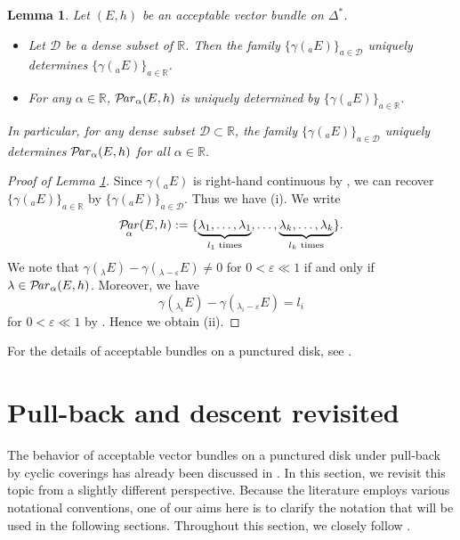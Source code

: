\documentclass[12pt,twoside]{amsart}
\DeclareMathOperator{\Par}{\mathcal{P}\!\it{ar}}
\newtheorem{lem}[thm]{Lemma}
\theoremstyle{definition}
\begin{document}
\begin{lem}\label{x-lem9.2}
Let $(E, h)$ be an acceptable vector bundle on $\Delta^*$. 
\begin{itemize}
\item[(i)] Let $\mathcal D$ be a dense subset of $\mathbb R$. 
Then the family $\{\gamma({}_a E)\}_{a\in \mathcal D}$ uniquely determines 
$\{\gamma({}_a E)\}_{a\in \mathbb R}$. 

\item[(ii)] For any $\alpha \in \mathbb R$, 
$\Par_\alpha (E, h)$ is uniquely determined by 
$\{\gamma({}_a E)\}_{a\in \mathbb R}$. 
\end{itemize}
In particular, for any dense subset $\mathcal D \subset \mathbb R$, 
the family $\{\gamma({}_a E)\}_{a\in \mathcal D}$ uniquely determines 
$\Par_\alpha (E, h)$ for all $\alpha \in \mathbb R$. 
\end{lem}

\begin{proof}[Proof of Lemma \ref{x-lem9.2}]
Since $\gamma ({}_a E)$ is right-hand continuous by 
\cite[Lemma 7.10]{fujino-fujisawa-ono}, we can recover 
$\{\gamma({}_a E)\}_{a\in \mathbb R}$ by 
$\{\gamma({}_a E)\}_{a\in \mathcal D}$. 
Thus we have (i). 
We write 
\[
\Par_\alpha(E, h) := \{\underbrace{\lambda_1, \ldots, \lambda_1}_{l_1\text{ times}}, \ldots,
\underbrace{\lambda_k, \ldots, \lambda_k}_{l_k\text{ times}}\}.
\] 
We note that $\gamma ({}_\lambda E)-\gamma({}_{\lambda-\varepsilon} E)\ne 0$ 
for $0<\varepsilon \ll 1$ if and only if 
$\lambda \in \Par_\alpha (E, h)$. 
Moreover, we have 
\[
\gamma ({}_{\lambda_i} E)-\gamma ({}_{\lambda_i-\varepsilon} E)=l_i
\] 
for 
$0<\varepsilon \ll 1$ by 
\cite[Lemma 7.12]{fujino-fujisawa-ono}. 
Hence we obtain (ii). 
\end{proof}

For the details of acceptable bundles on a punctured disk, 
see \cite{fujino-fujisawa-ono}. 

\section{Pull-back and descent revisited}\label{x-sec10}

The behavior of acceptable vector bundles on a punctured disk 
under pull-back by cyclic coverings has already been discussed in 
\cite[Section~11]{fujino-fujisawa-ono}.  
In this section, we revisit this topic from a slightly different perspective.  
Because the literature employs various notational conventions, 
one of our aims here is to clarify the notation that will be used in the following sections.  
Throughout this section, we closely follow 
\cite[21.4.2.~Pull-back and descent]{mochizuki4}.
\end{document}

